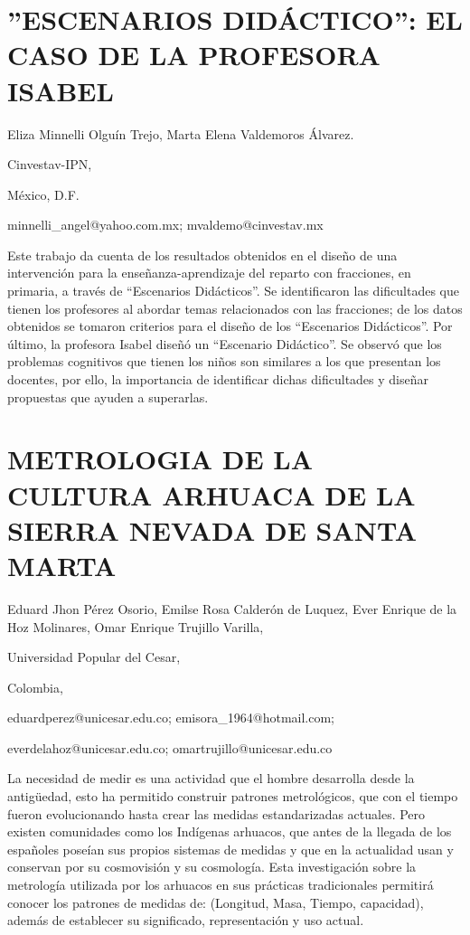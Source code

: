\section{\uppercase{ ''Escenarios Didáctico'': el Caso de la Profesora Isabel} }

\begin{datos}

Eliza Minnelli Olguín Trejo, Marta Elena Valdemoros Álvarez.

Cinvestav-IPN,

México, D.F.

minnelli\_angel@yahoo.com.mx; mvaldemo@cinvestav.mx 

\end{datos}

Este trabajo da cuenta de los resultados obtenidos en el diseño de
una intervención para la enseñanza-aprendizaje del reparto con fracciones,
en primaria, a través de “Escenarios Didácticos”. Se identificaron
las dificultades que tienen los profesores al abordar temas relacionados
con las fracciones; de los datos obtenidos se tomaron criterios para
el diseño de los “Escenarios Didácticos”. Por último, la profesora
Isabel diseñó un “Escenario Didáctico”. Se observó que los problemas
cognitivos que tienen los niños son similares a los que presentan
los docentes, por ello, la importancia de identificar dichas dificultades
y diseñar propuestas que ayuden a superarlas.


\section{METROLOGIA DE LA CULTURA ARHUACA DE LA SIERRA NEVADA DE SANTA MARTA }

\begin{datos}

Eduard Jhon Pérez Osorio, Emilse Rosa Calderón de Luquez, Ever Enrique
de la Hoz Molinares, Omar Enrique Trujillo Varilla,

Universidad Popular del Cesar,

Colombia,

eduardperez@unicesar.edu.co; emisora\_1964@hotmail.com;

everdelahoz@unicesar.edu.co; omartrujillo@unicesar.edu.co

\end{datos}

La necesidad de medir es una actividad que el hombre desarrolla desde
la antigüedad, esto ha permitido construir patrones metrológicos,
que con el tiempo fueron evolucionando hasta crear las medidas estandarizadas
actuales. Pero existen comunidades como los Indígenas arhuacos, que
antes de la llegada de los españoles poseían sus propios sistemas
de medidas y que en la actualidad usan y conservan por su cosmovisión
y su cosmología. Esta investigación sobre la metrología utilizada
por los arhuacos en sus prácticas tradicionales permitirá conocer
los patrones de medidas de: (Longitud, Masa, Tiempo, capacidad), además
de establecer su significado, representación y uso actual. 


